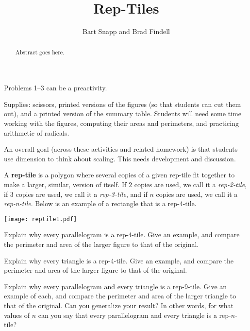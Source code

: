 \documentclass{ximera}
\title{Rep-Tiles}
\author{Bart Snapp and Brad Findell}
\begin{document}
\begin{abstract}
Abstract goes here.  
\end{abstract}
\maketitle

\begin{teachingnote}
Problems 1--3 can be a preactivity.  

Supplies: scissors, printed versions of the figures (so that students can cut them out), and a printed version of the summary table.   Students will need some time working with the figures, computing their areas and perimeters, and practicing arithmetic of radicals.   

An overall goal (across these activities and related homework) is that students use dimension to think about scaling. This needs development and discussion.  
\end{teachingnote}

A \textbf{rep-tile} is a polygon where several copies of
a given rep-tile fit together to make a larger, similar, version of
itself. If $2$ copies are used, we call it a \textit{rep-2-tile}, if
$3$ copies are used, we call it a \textit{rep-3-tile}, and if $n$ copies
are used, we call it a \textit{rep-n-tile}.  Below is an example of a rectangle 
that is a rep-4-tile.
\begin{image}
\texttt{[image: reptile1.pdf]}
\end{image}
\begin{problem}
Explain why every parallelogram is a rep-4-tile. Give an example, and compare the perimeter and area of the larger figure to that of the original.
\end{problem}

\begin{problem}
Explain why every triangle is a rep-4-tile. Give an example, and compare the perimeter and area of the larger figure to that of the
original.
\end{problem}

\begin{problem}
Explain why every parallelogram and every triangle is a rep-9-tile. Give an example of each, and compare the perimeter and area of the larger triangle to that of the original. Can you generalize your result?  In other words, for what values of $n$ can you say that every parallelogram and every triangle is a rep-$n$-tile?  
\end{problem}
\end{document}
